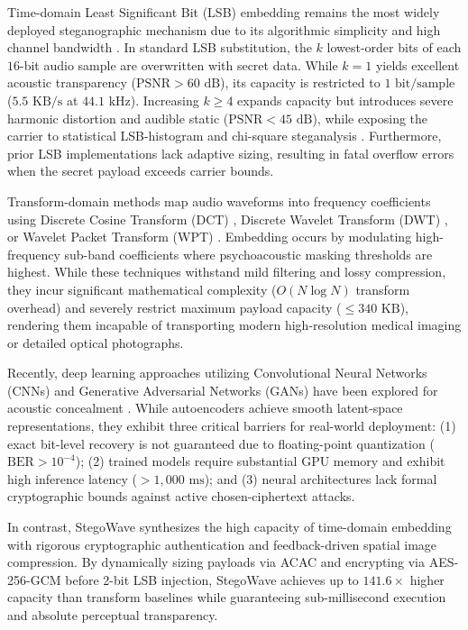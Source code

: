\documentclass[10pt,conference]{IEEEtran}
\begin{document}
Time-domain Least Significant Bit (LSB) embedding remains the most widely deployed steganographic mechanism due to its algorithmic simplicity and high channel bandwidth \cite{aslantas2022,chen2023,farouk2024}. In standard LSB substitution, the $k$ lowest-order bits of each $16$-bit audio sample are overwritten with secret data. While $k=1$ yields excellent acoustic transparency ($\text{PSNR} > 60\text{ dB}$), its capacity is restricted to $1\text{ bit/sample}$ ($5.5\text{ KB/s}$ at $44.1\text{ kHz}$). Increasing $k \ge 4$ expands capacity but introduces severe harmonic distortion and audible static ($\text{PSNR} < 45\text{ dB}$), while exposing the carrier to statistical LSB-histogram and chi-square steganalysis \cite{chen2023,hmood2024}. Furthermore, prior LSB implementations lack adaptive sizing, resulting in fatal overflow errors when the secret payload exceeds carrier bounds.

Transform-domain methods map audio waveforms into frequency coefficients using Discrete Cosine Transform (DCT) \cite{patel2022}, Discrete Wavelet Transform (DWT) \cite{kumar2023}, or Wavelet Packet Transform (WPT) \cite{martinez2023}. Embedding occurs by modulating high-frequency sub-band coefficients where psychoacoustic masking thresholds are highest. While these techniques withstand mild filtering and lossy compression, they incur significant mathematical complexity ($O(N \log N)$ transform overhead) and severely restrict maximum payload capacity ($\le 340\text{ KB}$), rendering them incapable of transporting modern high-resolution medical imaging or detailed optical photographs.

Recently, deep learning approaches utilizing Convolutional Neural Networks (CNNs) and Generative Adversarial Networks (GANs) have been explored for acoustic concealment \cite{sharma2023,ali2023,zhang2023}. While autoencoders achieve smooth latent-space representations, they exhibit three critical barriers for real-world deployment: (1) exact bit-level recovery is not guaranteed due to floating-point quantization ($\text{BER} > 10^{-4}$); (2) trained models require substantial GPU memory and exhibit high inference latency ($>1,000\text{ ms}$); and (3) neural architectures lack formal cryptographic bounds against active chosen-ciphertext attacks.

In contrast, StegoWave synthesizes the high capacity of time-domain embedding with rigorous cryptographic authentication and feedback-driven spatial image compression. By dynamically sizing payloads via ACAC and encrypting via AES-256-GCM before 2-bit LSB injection, StegoWave achieves up to $141.6\times$ higher capacity than transform baselines while guaranteeing sub-millisecond execution and absolute perceptual transparency.
\end{document}
